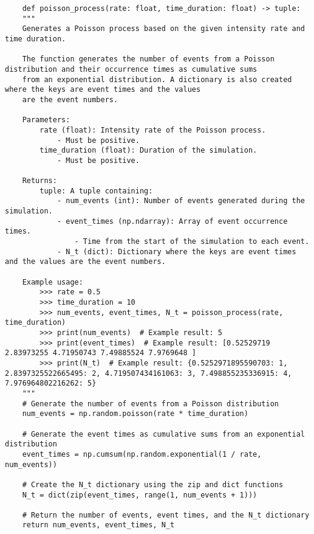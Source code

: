 \documentclass[12pt,letterpaper]{article}
\theoremstyle{definition}
\begin{document}
\begin{lstlisting}
    def poisson_process(rate: float, time_duration: float) -> tuple:
    """
    Generates a Poisson process based on the given intensity rate and time duration.

    The function generates the number of events from a Poisson distribution and their occurrence times as cumulative sums
    from an exponential distribution. A dictionary is also created where the keys are event times and the values
    are the event numbers.

    Parameters:
        rate (float): Intensity rate of the Poisson process.
            - Must be positive.
        time_duration (float): Duration of the simulation.
            - Must be positive.

    Returns:
        tuple: A tuple containing:
            - num_events (int): Number of events generated during the simulation.
            - event_times (np.ndarray): Array of event occurrence times.
                - Time from the start of the simulation to each event.
            - N_t (dict): Dictionary where the keys are event times and the values are the event numbers.

    Example usage:
        >>> rate = 0.5
        >>> time_duration = 10
        >>> num_events, event_times, N_t = poisson_process(rate, time_duration)
        >>> print(num_events)  # Example result: 5
        >>> print(event_times)  # Example result: [0.52529719 2.83973255 4.71950743 7.49885524 7.9769648 ]
        >>> print(N_t)  # Example result: {0.5252971895590703: 1, 2.8397325522665495: 2, 4.719507434161063: 3, 7.498855235336915: 4, 7.976964802216262: 5}
    """
    # Generate the number of events from a Poisson distribution
    num_events = np.random.poisson(rate * time_duration)

    # Generate the event times as cumulative sums from an exponential distribution
    event_times = np.cumsum(np.random.exponential(1 / rate, num_events))

    # Create the N_t dictionary using the zip and dict functions
    N_t = dict(zip(event_times, range(1, num_events + 1)))

    # Return the number of events, event times, and the N_t dictionary
    return num_events, event_times, N_t

\end{lstlisting}
\end{document}
